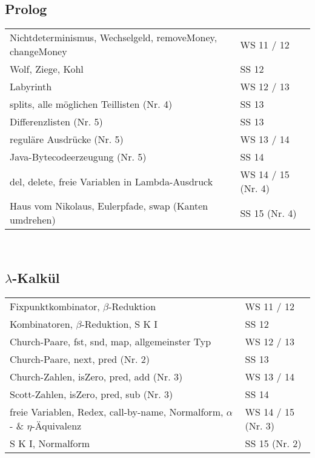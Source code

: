 \subsection{Prolog}
\begin{table}[h]
	\centering
	\label{my-label}
	\begin{tabular}{ll}
		Nichtdeterminismus, Wechselgeld, removeMoney, changeMoney
		& WS 11 / 12  \\
				
		Wolf, Ziege, Kohl
		& SS 12 \\
		
		Labyrinth
		& WS 12 / 13 \\
		
		splits, alle möglichen Teillisten (Nr. 4)
		& SS 13 \\
		
		Differenzlisten (Nr. 5)
		& SS 13 \\
		
		reguläre Ausdrücke (Nr. 5)
		& WS 13 / 14 \\
		
		Java-Bytecodeerzeugung (Nr. 5)
		& SS 14 \\
		
		del, delete, freie Variablen in Lambda-Ausdruck
		& WS 14 / 15 (Nr. 4) \\
		
		Haus vom Nikolaus, Eulerpfade, swap (Kanten umdrehen)
		& SS 15 (Nr. 4) \\
	\end{tabular}
\end{table}
~\\

\subsection{$\lambda$-Kalkül}
\begin{table}[h]
\centering
\label{my-label}
\begin{tabular}{ll}
	Fixpunktkombinator, $\beta$-Reduktion
	& WS 11 / 12  \\
	
	Kombinatoren, $\beta$-Reduktion, S K I
	& SS 12 \\
	
	Church-Paare, fst, snd, map, allgemeinster Typ
	& WS 12 / 13 \\
	
	Church-Paare, next, pred (Nr. 2)
	& SS 13 \\
	
	Church-Zahlen, isZero, pred, add (Nr. 3)
	& WS 13 / 14 \\
	
	Scott-Zahlen, isZero, pred, sub (Nr. 3)
	& SS 14 \\
	
	freie Variablen, Redex, call-by-name, Normalform, $\alpha$- \& $\eta$-Äquivalenz 
	& WS 14 / 15 (Nr. 3) \\
	
	S K I, Normalform
	& SS 15 (Nr. 2) \\
\end{tabular}
\end{table}
~\\


